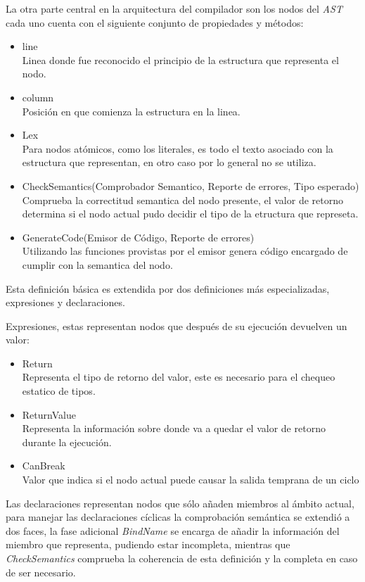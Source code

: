 \documentclass[a4paper,10pt]{article}
\begin{document}
		La otra parte central en la arquitectura del compilador son los nodos del \textit{AST} cada uno cuenta con el siguiente conjunto de propiedades y métodos:
		\begin{itemize}
			\item line \\
			Linea donde fue reconocido el principio de la estructura que representa el nodo.
			\item column \\
			Posición en que comienza la estructura en la linea.
			\item Lex \\
			Para nodos atómicos, como los literales, es todo el texto asociado con la estructura que representan, en otro caso por lo general no se utiliza.
			\item CheckSemantics(Comprobador Semantico, Reporte de errores, Tipo esperado) \\
			Comprueba la correctitud semantica del nodo presente,
			el valor de retorno determina si el nodo actual pudo decidir el tipo de la etructura que represeta.
			\item GenerateCode(Emisor de Código, Reporte de errores) \\
			Utilizando las funciones provistas por el emisor genera código encargado de cumplir con la semantica del nodo.
		\end{itemize}
		
		Esta definición básica es extendida por dos definiciones más especializadas, expresiones y declaraciones.
		
		Expresiones, estas representan nodos que después de su ejecución devuelven un valor:
		\begin{itemize}
			\item Return \\
			Representa el tipo de retorno del valor, este es necesario para el chequeo estatico de tipos.
			\item ReturnValue \\
			Representa la información sobre donde %
			va a quedar el valor de retorno durante la ejecución.
			\item CanBreak \\
			Valor que indica si el nodo actual puede causar la salida temprana de un ciclo
		\end{itemize}
		
		Las declaraciones representan nodos que sólo añaden miembros al ámbito actual, para manejar las declaraciones cíclicas la comprobación semántica se extendió a dos faces, la fase adicional \textit{BindName} se encarga de añadir la información del miembro que representa, pudiendo estar incompleta, mientras que \textit{CheckSemantics} comprueba la coherencia de esta definición y la completa en caso de ser necesario.
		
\end{document}
